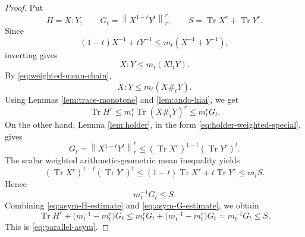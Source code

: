 \documentclass[10pt,a4paper]{amsart}
\newcommand{\Tr}{\operatorname{Tr}}
\newcommand{\norm}[1]{\left\lVert #1\right\rVert}
\begin{document}
\begin{proof}
Put
\[
    H=X:Y,\qquad
    G_t=\norm{X^{1-t}Y^t}_r^r,\qquad
    S=\Tr X^r+\Tr Y^r.
\]
Since
\[
    (1-t)X^{-1}+tY^{-1}
    \le
    m_t(X^{-1}+Y^{-1}),
\]
inverting gives
\[
    X:Y\le m_t(X!_tY).
\]
By \eqref{eq:weighted-mean-chain},
\[
    X:Y\le m_t(X\#_tY).
\]
Using Lemmas \ref{lem:trace-monotone} and \ref{lem:ando-hiai}, we get
\begin{equation}\label{eq:asym-H-estimate}
    \Tr H^r
    \le
    m_t^r\Tr(X\#_tY)^r
    \le
    m_t^r G_t.
\end{equation}
On the other hand, Lemma \ref{lem:holder}, in the form \eqref{eq:holder-weighted-special}, gives
\begin{equation}\label{eq:asym-holder}
    G_t
    =
    \norm{X^{1-t}Y^t}_r^r
    \le
    (\Tr X^r)^{1-t}(\Tr Y^r)^t.
\end{equation}
The scalar weighted arithmetic-geometric mean inequality yields
\[
    (\Tr X^r)^{1-t}(\Tr Y^r)^t
    \le
    (1-t)\Tr X^r+t\Tr Y^r
    \le
    m_tS.
\]
Hence
\begin{equation}\label{eq:asym-G-estimate}
    m_t^{-1}G_t\le S.
\end{equation}
Combining \eqref{eq:asym-H-estimate} and \eqref{eq:asym-G-estimate}, we obtain
\[
    \Tr H^r+
    \bigl(m_t^{-1}-m_t^r\bigr)G_t
    \le
    m_t^rG_t+
    \bigl(m_t^{-1}-m_t^r\bigr)G_t
    =
    m_t^{-1}G_t
    \le S.
\]
This is \eqref{eq:parallel-asym}.
\end{proof}
\end{document}
